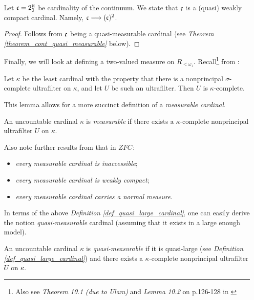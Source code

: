 \begin{theorem}
  Let $\mathfrak{c} = 2^\aleph_0$ be cardinality of the continuum. We state that $\mathfrak{c}$ is a (quasi) weakly compact cardinal. Namely, $\mathfrak{c} \longrightarrow (\mathfrak{c})^2$.
\end{theorem}
\begin{proof}
  Follows from $\mathfrak{c}$ being a quasi-measurable cardinal (see \textit{Theorem \ref{theorem_cont_quasi_measurable}} below).
\end{proof}

Finally, we will look at defining a two-valued measure on $R_{<\omega_1}$. Recall\footnote{Also see \textit{Theorem 10.1 (due to Ulam)} and \textit{Lemma 10.2} on p.126-128 in \cite{jech2003set}} from \cite{jech2003set}:

\begin{lemma}
  Let \(\kappa\) be the least cardinal with the property that there is a nonprincipal \(\sigma\)-complete ultrafilter on \(\kappa\), and let \(U\) be such an ultrafilter. Then \(U\) is \(\kappa\)-complete.
\end{lemma}

This lemma allows for a more succinct definition of a \textit{measurable cardinal}. 

\begin{definition}\label{def_measurable_cardinal}
  An uncountable cardinal \(\kappa\) is \textit{measurable} if there exists a \(\kappa\)-complete nonprincipal ultrafilter \(U\) on \(\kappa\).
\end{definition}

Also note further results from \cite{jech2003set} that in $ZFC$:
\begin{itemize}
  \item \textit{every measurable cardinal is inaccessible};
  \item \textit{every measurable cardinal is weakly compact};
  \item \textit{every measurable cardinal carries a normal measure}.
\end{itemize}

In terms of the above \textit{Definition \ref{def_quasi_large_cardinal}}, one can easily derive the notion \textit{quasi-measurable} cardinal (assuming that it exists in a large enough model).

\begin{definition}\label{def_quasimeasurable_cardinal}
  An uncountable cardinal \(\kappa\) is \textit{quasi-measurable} if it is quasi-large (see \textit{Definition \ref{def_quasi_large_cardinal}}) and there exists a \(\kappa\)-complete nonprincipal ultrafilter \(U\) on \(\kappa\).
\end{definition}


